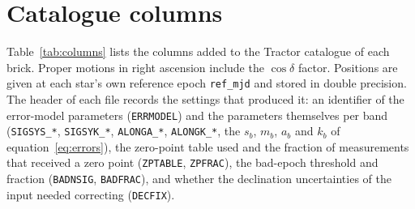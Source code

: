 \documentclass[usenatbib]{mnras}   %
\begin{document}
\clearpage
\newpage



\appendix

\section{Catalogue columns} \label{app:columns}

Table~\ref{tab:columns} lists the columns added to the Tractor catalogue of each brick. Proper motions in right ascension include the $\cos\delta$ factor. Positions are given at each star's own reference epoch \texttt{ref\_mjd} and stored in double precision. The header of each file records the settings that produced it: an identifier of the error-model parameters (\texttt{ERRMODEL}) and the parameters themselves per band (\texttt{SIGSYS\_*}, \texttt{SIGSYK\_*}, \texttt{ALONGA\_*}, \texttt{ALONGK\_*}, the $s_b$, $m_b$, $a_b$ and $k_b$ of equation~\ref{eq:errors}), the zero-point table used and the fraction of measurements that received a zero point (\texttt{ZPTABLE}, \texttt{ZPFRAC}), the bad-epoch threshold and fraction (\texttt{BADNSIG}, \texttt{BADFRAC}), and whether the declination uncertainties of the input needed correcting (\texttt{DECFIX}).
\end{document}
